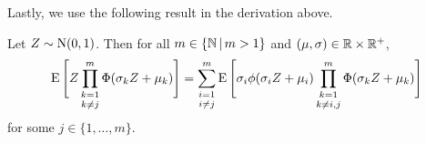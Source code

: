 %
%

Lastly, we use the following result in the derivation above.
\begin{lemma}\label{lem:EZgZ}
  Let $Z \sim \operatorname{N}(0,1)$. Then for all $m \in \{\mathbb{N} \, | \, m > 1\}$ and $(\mu, \sigma) \in \mathbb{R} \times \mathbb{R}^+$, 
  \[
    \operatorname{E} \Bigg[ Z \mathop{\prod_{k=1}^m}_{k \neq j} \Phi(\sigma_k Z + \mu_k) \Bigg]
    = \mathop{\sum_{i=1}^m}_{i \neq j} \operatorname{E} \Bigg[ \sigma_i \phi(\sigma_i Z + \mu_i) \mathop{\prod_{k=1}^m}_{k \neq i,j} \Phi (\sigma_k Z + \mu_k) \Bigg]
  \]
  for some $j \in \{1, \dots, m\}$.
\end{lemma}

